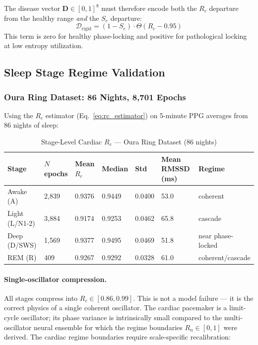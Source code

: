 \documentclass[12pt,a4paper]{article}
\theoremstyle{definition}
\begin{document}
The disease vector $\mathbf{D} \in [0,1]^8$ must therefore encode both
the $R_c$ departure from the healthy range \emph{and} the $S_e$ departure:
\begin{equation}
\mathcal{D}_{\text{rigid}} = \left(1 - S_e\right) \cdot \Theta(R_c - 0.95)
\end{equation}
This term is zero for healthy phase-locking and positive for pathological
locking at low entropy utilization.

\subsection{Sleep Stage Regime Validation}

\subsubsection{Oura Ring Dataset: 86 Nights, 8{,}701 Epochs}

Using the $R_c$ estimator (Eq.~\ref{eq:rc_estimator}) on 5-minute PPG
averages from 86 nights of sleep:

\begin{table}[H]
\centering
\caption{Stage-Level Cardiac $R_c$ --- Oura Ring Dataset (86 nights)}
\label{tab:oura_stages}
\begin{tabular}{lllllll}
\toprule
\textbf{Stage} & \textbf{$N$ epochs} & \textbf{Mean $R_c$} & \textbf{Median} &
\textbf{Std} & \textbf{Mean RMSSD (ms)} & \textbf{Regime}\\
\midrule
Awake (A)     & 2,839 & 0.9376 & 0.9449 & 0.0400 & 53.0 & coherent\\
Light (L/N1-2)& 3,884 & 0.9174 & 0.9253 & 0.0462 & 65.8 & cascade\\
Deep (D/SWS)  & 1,569 & 0.9377 & 0.9495 & 0.0469 & 51.8 & near phase-locked\\
REM (R)       &   409 & 0.9267 & 0.9292 & 0.0328 & 61.0 & coherent/cascade\\
\bottomrule
\end{tabular}
\end{table}

\paragraph{Single-oscillator compression.}
All stages compress into $R_c \in [0.86, 0.99]$. This is not a model
failure --- it is the correct physics of a single coherent oscillator.
The cardiac pacemaker is a limit-cycle oscillator; its phase variance is
intrinsically small compared to the multi-oscillator neural ensemble for
which the regime boundaries $R_n \in [0, 1]$ were derived. The cardiac
regime boundaries require scale-specific recalibration:
\end{document}
